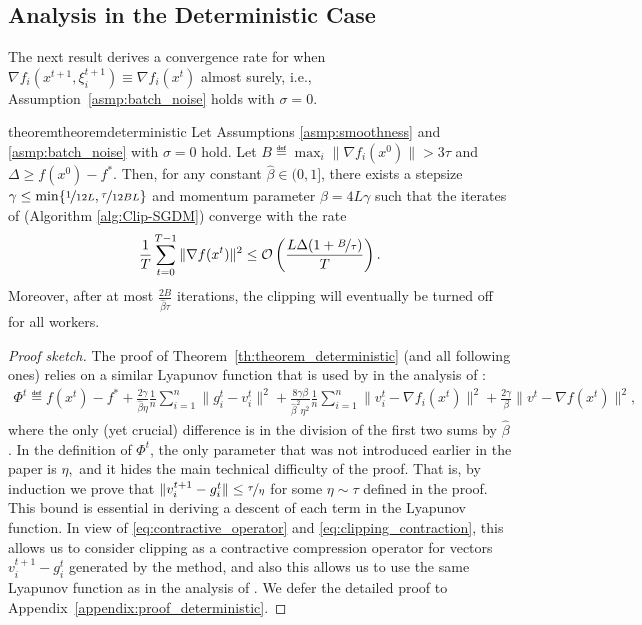 \documentclass[a4paper,11pt]{article}
\begin{document}
\subsection{Analysis in the Deterministic Case}

The next result derives a convergence rate for  when $\nabla f_i(x^{t+1},\xi^{t+1}_i) \equiv \nabla f_i(x^t)$ almost surely, i.e., Assumption~\ref{asmp:batch_noise} holds with $\sigma = 0$.


\begin{restatable}[Simplified]{theorem}{theoremdeterministic}\label{th:theorem_deterministic}
    Let Assumptions \ref{asmp:smoothness} and \ref{asmp:batch_noise} with $\sigma = 0$ hold. Let $B\eqdef\max_i\|\nabla f_i(x^0)\| > 3\tau$ and $\Delta \ge f(x^0) - f^*.$ Then, for any constant $\hat{\beta}\in (0,1]$, there exists a stepsize $\gamma\le \min\{\nicefrac{1}{12L}, \nicefrac{\tau}{12BL}\}$ and momentum parameter $\beta=4L\gamma$ such that the iterates of  (Algorithm \ref{alg:Clip-SGDM}) converge with the rate
    \begin{align}
    \frac{1}{T}\sum_{t=0}^{T-1}\|\nabla f(x^t)\|^2  \le \mathcal O\left(\frac{L\Delta (1 + \nicefrac{B}{\tau})}{T}\right). \label{eq:deterministic_rate}
    \end{align}
    Moreover, after at most $\frac{2B}{\hat{\beta}\tau}$ iterations, the clipping will eventually be turned off for all workers.
\end{restatable}
\vspace{-3mm}
\begin{proof}[Proof sketch]
    The proof of Theorem~\ref{th:theorem_deterministic} (and all following ones) relies on a similar Lyapunov function that is used by \citet{fatkhullin2024momentum} in the analysis of : 
\begin{align}\label{eq:lyapunov_function}
    \Phi^t \eqdef f(x^t) - f^*
    + \frac{2\gamma}{\hat{\beta}\eta}\frac{1}{n}\sum_{i=1}^n\|g_i^t - v_i^t\|^2
    + \frac{8\gamma\beta}{\hat{\beta}^2\eta^2}\frac{1}{n}\sum_{i=1}^n\|v_i^t - \nabla f_i(x^t)\|^2
    + \frac{2\gamma}{\beta}\|v^t - \nabla f(x^t)\|^2,
\end{align}
where the only (yet crucial) difference is in the division of the first two sums by $\hat\beta$. In the definition of $\Phi^t$, the only parameter that was not introduced earlier in the paper is $\eta,$ and it hides the main technical difficulty of the proof. That is, by induction we prove that $\|v_i^{t+1} - g_i^t\| \leq \nicefrac{\tau}{\eta}$ for some $\eta \sim \tau$ defined in the proof. This bound is essential in deriving a descent of each term in the Lyapunov function.
In view of \eqref{eq:contractive_operator} and \eqref{eq:clipping_contraction}, this allows us to consider clipping as a contractive compression operator for vectors $v_i^{t+1} - g_i^t$ generated by the method, and also this allows us to use the same Lyapunov function as in the analysis of . We defer the detailed proof to Appendix~\ref{appendix:proof_deterministic}.
\end{proof}
\end{document}
